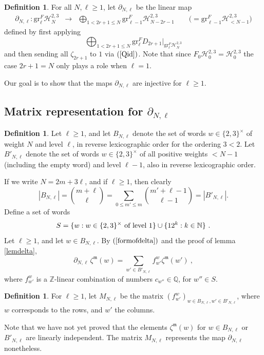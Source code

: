 \documentclass[10pt]{amsart}
\theoremstyle{definition}
\newtheorem{defn}[thm]{Definition}
\theoremstyle{remark}
\numberwithin{equation}{section}
\newcommand{\Z}{\mathbb Z}
\newcommand{\N}{\mathbb N}
\newcommand{\gr}{\mathrm{gr}}
\newcommand{\Ho}{\mathcal{H}}
\newcommand{\zetam}{\zeta^{ \mathfrak{m}}}
\newcommand{\Q}{\mathbb Q}
\newcommand{\To}{\longrightarrow}
\begin{document}
\begin{defn}  For all $N, \ell\geq 1$, let $\partial_{N,\ell}$ be the linear  map 
\begin{eqnarray}
\partial_{N,\ell}:  \gr^F_\ell \Ho^{2,3}_N & \To & \bigoplus_{  1< 2 r+1  \leq N  } \gr^F_{\ell-1} \Ho^{2,3}_{N-2r-1} \qquad \Big( = \gr^F_{\ell-1} \Ho^{2,3}_{<N-1}\Big) \nonumber  
\end{eqnarray}
defined by  first applying 
$$\bigoplus_{1 < 2r+1 \leq N}\gr^F_{\ell} D_{2r+1}\Big|_{\gr^F_\ell \Ho^{2,3}_N}
$$
and then sending all $\zeta_{2r+1}$ to $1$ via  $(\ref{Qid})$. Note that since $F_0 \Ho_0^{2,3}= \Ho_0^{2,3}$ the case $2r+1=N$ only plays a role when $\ell=1$.
\end{defn}
Our goal is to show that the  maps  $\partial_{N,\ell}$ are  injective for $\ell \geq 1$. 

\subsection{Matrix representation for $\partial_{N,\ell}$}

 \begin{defn} 
Let $\ell \geq 1$, and let  $B_{N,\ell}$  denote the set of words $w\in \{2,3\}^{\times}$ of weight $N$ and level $\ell$,   in reverse lexicographic order  for the ordering $3<2$. Let $B'_{N,\ell}$ denote the set
of words $w \in \{2,3\}^{\times}$ of all positive weights $<N-1$ (including the empty word) and level $\ell-1$, also in reverse  lexicographic order.
\end{defn}
If we write $N=2m+3\ell$, and if $\ell\geq 1$, then clearly
$$|B_{N,\ell}| = \binom{{m+\ell}}{\ell}  = \sum_{0\leq m'\leq m} \binom{m'+\ell-1}{\ell-1} = |B'_{N,\ell}|.$$
Define a set of words
\begin{equation} \label{Sdef} S= \{w: w\in \{2,3\}^{\times} \hbox{ of level } 1\} \cup \{ 12^k: k\in \N \}\  .\end{equation}
  Let $\ell\geq 1$, and let $w\in B_{N,\ell}$. By $(\ref{formofdelta})$ and the proof of lemma \ref{lemdelta}, 
  \begin{equation} \label{deltaf}
  \partial_{N,\ell} \,\zetam(w) = \sum_{w'\in B'_{N,\ell}} f^w_{w'} \zetam(w')\ ,\end{equation}
  where $f^w_{w'}$ is a $\Z$-linear combination of numbers $c_{w''}\in \Q$, for $w''\in S$.
   \begin{defn} For $\ell\geq 1$, let $M_{N,\ell}$  be the matrix  $(f^w_{w'})_{w\in B_{N,\ell}, w'\in B'_{N,\ell}}$, where $w$ corresponds to the rows, and $w'$ the columns.
 \end{defn}
Note that we have not yet proved that the elements $\zetam(w)$ for $w\in B_{N,\ell}$ or $B'_{N,\ell}$  are linearly independent. The matrix $M_{N,\ell}$ represents the map $\partial_{N,\ell}$  nonetheless.
\end{document}
